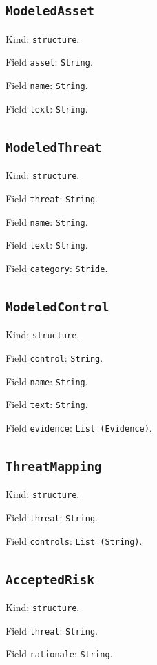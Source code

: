 \documentclass[11pt]{article}
\begin{document}
\subsection*{\texttt{ModeledAsset}}
\noindent Kind: \texttt{structure}.\par
\noindent Field \texttt{asset}: \texttt{String}.\par
\noindent Field \texttt{name}: \texttt{String}.\par
\noindent Field \texttt{text}: \texttt{String}.\par
\subsection*{\texttt{ModeledThreat}}
\noindent Kind: \texttt{structure}.\par
\noindent Field \texttt{threat}: \texttt{String}.\par
\noindent Field \texttt{name}: \texttt{String}.\par
\noindent Field \texttt{text}: \texttt{String}.\par
\noindent Field \texttt{category}: \texttt{Stride}.\par
\subsection*{\texttt{ModeledControl}}
\noindent Kind: \texttt{structure}.\par
\noindent Field \texttt{control}: \texttt{String}.\par
\noindent Field \texttt{name}: \texttt{String}.\par
\noindent Field \texttt{text}: \texttt{String}.\par
\noindent Field \texttt{evidence}: \texttt{List (Evidence)}.\par
\subsection*{\texttt{ThreatMapping}}
\noindent Kind: \texttt{structure}.\par
\noindent Field \texttt{threat}: \texttt{String}.\par
\noindent Field \texttt{controls}: \texttt{List (String)}.\par
\subsection*{\texttt{AcceptedRisk}}
\noindent Kind: \texttt{structure}.\par
\noindent Field \texttt{threat}: \texttt{String}.\par
\noindent Field \texttt{rationale}: \texttt{String}.\par
\end{document}
